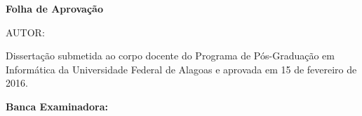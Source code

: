 %
% 

\newcommand{\imprimiraprovpreambulo}{
	Dissertação submetida ao corpo docente do Programa de Pós-Graduação em Informática da Universidade
	Federal de Alagoas e aprovada em 15 de fevereiro de 2016.
}

\begin{folhadeaprovacao}

  \begin{center}
  	{\ABNTEXchapterfont\bfseries\large Folha de Aprovação}
  	\vspace*{\fill}\vspace*{\fill}
  	 
    {\ABNTEXchapterfont \large{AUTOR:~\imprimirautor}}

    \vspace*{\fill}\vspace*{\fill}
	\imprimirtitulo
    \vspace*{\fill}
    
    \hspace{.45\textwidth}
    \begin{minipage}{.5\textwidth}
        \imprimiraprovpreambulo
    \end{minipage}%
    \vspace*{\fill}
   \end{center}
        
   \vspace*{\fill}\vspace*{\fill} 
    
   \textbf{\large Banca Examinadora:}
      
   \begin{center}
    \vspace*{0.5cm}
    {\Large\imprimirlocal}
    \par
    {\Large\imprimirdata}
    \vspace*{1cm}
  \end{center}
  
\end{folhadeaprovacao}

